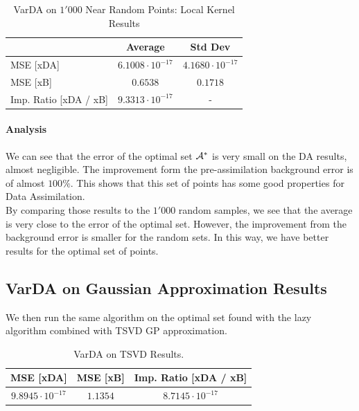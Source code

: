 \begin{table}[h]
\centering
\begin{tabular}{l|cc}
\toprule
               & Average & Std Dev \\ \midrule
MSE [xDA]      & $6.1008 \cdot 10^{-17}$  & $4.1680 \cdot 10^{-17}$  \\
MSE [xB]       & $0.6538$  & $0.1718$  \\
Imp. Ratio [xDA / xB]  &   $9.3313 \cdot 10^{-17}$  & - \\ \bottomrule
\end{tabular}
    \caption{VarDA on $1'000$ Near Random Points: Local Kernel Results}
    \label{tab:varDa:random}
\end{table}

\paragraph{Analysis}

We can see that the error of the optimal set $\mathcal{A}^*$ is very small on the DA results, almost negligible. The improvement form the pre-assimilation background error is of almost $100\%$. This shows that this set of points has some good properties for Data Assimilation. \\

By comparing those results to the $1'000$ random samples, we see that the average is very close to the error of the optimal set. However, the improvement from the background error is smaller for the random sets. In this way, we have better results for the optimal set of points.  



\subsection{VarDA on Gaussian Approximation Results}

We then run the same algorithm on the optimal set found with the lazy algorithm combined with TSVD GP approximation. 

\begin{table}[h]
\centering
    \begin{tabular}{c|c|c}
    \toprule
          MSE [xDA] & MSE [xB] &  Imp. Ratio [xDA / xB] \\ \midrule
        $9.8945 \cdot 10^{-17}$  &  $1.1354$ & $8.7145 \cdot 10^{-17} $ \\ \bottomrule
    \end{tabular}
    \caption{VarDA on TSVD Results. }
\end{table}

